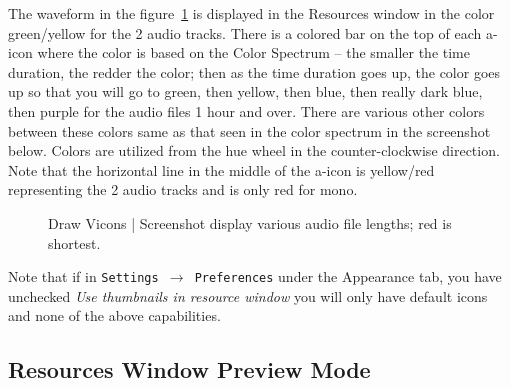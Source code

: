 The waveform in the figure~\ref{fig:vicons2} is displayed in the Resources window in the color green/yellow for the 2 audio tracks. 
There is a colored bar on the top of each a-icon where the color is based on the Color Spectrum -- the smaller the time duration, the redder the color; then as the time duration goes up, the color goes up so that you will go to green, then yellow, then blue, then really dark blue, then purple for the audio files 1 hour and over.  
There are various other colors between these colors same as that seen in the color spectrum in the screenshot below.  
Colors are utilized from the hue wheel in the counter-clockwise direction.  
Note that the horizontal line in the middle of the a-icon is yellow/red representing the 2 audio tracks and is only red for mono.



\begin{figure}[htpb]
    \centering
    \caption{Draw Vicons   |            Screenshot display various audio file lengths; red is shortest.}
    \label{fig:vicons2}
\end{figure}

Note that if in \texttt{Settings $\rightarrow$ Preferences} under the Appearance tab, you have unchecked \textit{Use thumbnails in resource window} you will only have default icons and none of the above capabilities.


\subsection{Resources Window Preview Mode}%
\label{sub:resources_window_preview_mode}


